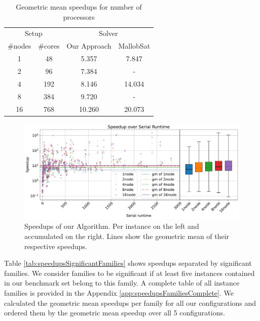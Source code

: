 \documentclass[12pt,a4paper,twoside]{scrartcl}
\numberwithin{equation}{section}
\begin{document}
\begin{table}[!h]
  \center
  \begin{tabular}{ cccc }
    \toprule
    \multicolumn{2}{c}{Setup} & \multicolumn{2}{c}{Solver}\\
    \#nodes   & \#cores   & Our Approach  & MallobSat \\
    \midrule
    1  & 48  & 5.357    & 7.847\\
    2  & 96  & 7.384    & -\\
    4  & 192 & 8.146    & 14.034\\
    8  & 384 & 9.720    & -\\
    16 & 768 & 10.260   & 20.073\\
    \bottomrule
  \end{tabular}
  \caption{Geometric mean speedups for number of processors}
  \label{tab:speedups}
\end{table}

\begin{figure}[!h]
  \center
  \includegraphics[scale=.45]{plots/speedups_gim.pdf}
  \caption{Speedups of our Algorithm. Per instance on the left and accumulated on the right. Lines show the geometric mean of their respective speedups.}
  \label{fig:speedups}
\end{figure}


Table \ref{tab:speedupsSignificantFamilies} shows speedups separated by significant families. We consider families to be significant if at least five instances contained in our benchmark set belong to this family. A complete table of all instance families is provided in the Appendix \ref{app:speedupsFamiliesComplete}. We calculated the geometric mean speedups per family for all our configurations and ordered them by the geometric mean speedup over all 5 configurations.
\end{document}
